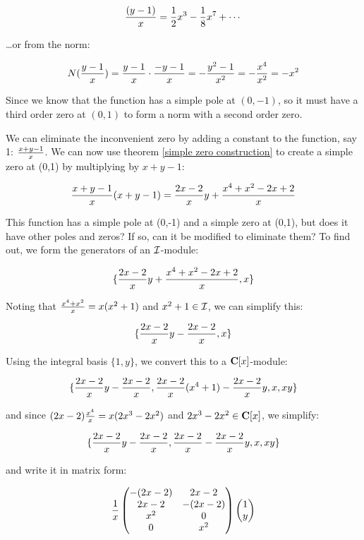 $$ {(y-1)\over x} = {1\over2} x^3 - {1\over8} x^7 + \cdots$$

\ldots or from the norm:

$$N({{y-1}\over{x}}) = {{y-1}\over{x}} \cdot {{-y-1}\over{x}} = - {{y^2-1}\over{x^2}} = - {{x^4}\over{x^2}} = - x^2$$

Since we know that the function has a simple pole at $(0,-1)$, so it
must have a third order zero at $(0,1)$ to form a norm with a second
order zero.

We can eliminate the inconvenient zero by adding a constant to the
function, say 1: ${{x+y-1}\over x}$.  We can now use theorem
\ref{simple zero construction} to create a simple zero at
(0,1) by multiplying by $x+y-1$:

$${{x+y-1}\over x} (x+y-1) = {{2x-2}\over x} y + {{x^4+x^2-2x+2}\over x} $$

This function has a simple pole at (0,-1) and a simple zero at (0,1),
but does it have other poles and zeros?  If so, can it be modified to
eliminate them?  To find out, we form the generators of an ${\cal I}$-module:

$$\{ {{2x-2}\over x} y + {{x^4+x^2-2x+2}\over x}, x \}$$

Noting that ${{x^4+x^2}\over{x}} = x(x^2+1)$ and $x^2+1 \in {\cal I}$,
we can simplify this:

$$\{ {{2x-2}\over x} y - {{2x-2}\over x}, x \}$$

\vfill\eject

Using the integral basis $\{1, y \}$, we convert this to a
${\bf C}[x]$-module:

$$\{ {{2x-2}\over x} y - {{2x-2}\over x}, {{2x-2}\over x} (x^4+1) - {{2x-2}\over x} y, x, xy \}$$

and since $(2x-2){{x^4}\over{x}} = x(2x^3-2x^2)$ and
$2x^3-2x^2 \in {\bf C}[x]$, we simplify:

$$\{ {{2x-2}\over x} y - {{2x-2}\over x}, {{2x-2}\over x} - {{2x-2}\over x} y, x, xy \}$$

and write it in matrix form:


$${1\over x}\begin{pmatrix}-(2x-2) & 2x-2 \cr 2x-2 & -(2x-2) \cr x^2 & 0 \cr 0 & x^2\end{pmatrix} \begin{pmatrix}1 \cr y\end{pmatrix}$$

